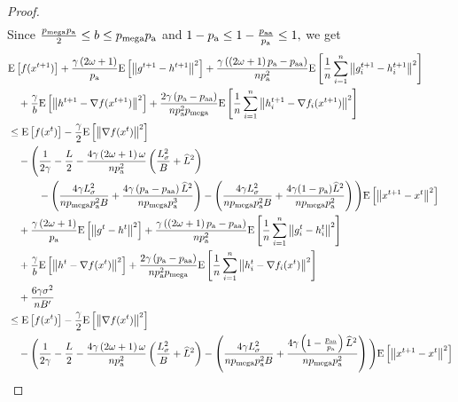 \documentclass{article}
\newcommand*{\probavailable}{\ensuremath{p_{\textnormal{a}}}}
\newcommand*{\probpairaa}{\ensuremath{p_{\textnormal{aa}}}}
\newcommand*{\probmega}{\ensuremath{p_{\text{mega}}}}
\begin{document}
\begin{proof}
\begin{align*}
  \end{align*}
  Since $\frac{\probmega \probavailable}{2} \leq b \leq \probmega \probavailable$ and $1 - \probavailable \leq 1 - \frac{\probpairaa}{\probavailable}\leq 1,$ we get 
  \begin{align*}
    &\Exp{f(x^{t + 1})} + \frac{\gamma \left(2 \omega + 1\right)}{\probavailable} \Exp{\norm{g^{t+1} - h^{t+1}}^2} + \frac{\gamma\left(\left(2 \omega + 1\right)\probavailable - \probpairaa\right)}{n \probavailable^2} \Exp{\frac{1}{n}\sum_{i=1}^n\norm{g^{t+1}_i - h^{t+1}_i}^2}\\
    &\quad  + \frac{\gamma}{b} \Exp{\norm{h^{t+1} - \nabla f(x^{t+1})}^2} + \frac{2 \gamma \left(\probavailable - \probpairaa\right)}{n \probavailable^2 \probmega} \Exp{\frac{1}{n}\sum_{i=1}^n\norm{h^{t+1}_i - \nabla f_i(x^{t+1})}^2}\\
    &\leq \Exp{f(x^t)} - \frac{\gamma}{2}\Exp{\norm{\nabla f(x^t)}^2} \\
    &\quad - \Bigg(\frac{1}{2\gamma} - \frac{L}{2} - \frac{4 \gamma \left(2\omega + 1\right) \omega}{n \probavailable^2}\left(\frac{L_{\sigma}^2}{B} + \widehat{L}^2\right) \\
    &\qquad\quad - \left(\frac{4 \gamma L_{\sigma}^2}{n \probmega \probavailable^2 B} + \frac{4\gamma\left(\probavailable - \probpairaa\right) \widehat{L}^2}{n \probmega \probavailable^3}\right) - \left(\frac{4 \gamma L_{\sigma}^2}{n \probmega \probavailable^2 B} + \frac{4 \gamma (1 - \probavailable) \widehat{L}^2}{n \probmega \probavailable^2}\right)\Bigg) \Exp{\norm{x^{t+1} - x^t}^2} \\
    &\quad + \frac{\gamma \left(2 \omega + 1\right)}{\probavailable} \Exp{\norm{g^{t} - h^{t}}^2} + \frac{\gamma\left(\left(2 \omega + 1\right)\probavailable - \probpairaa\right)}{n \probavailable^2}\Exp{\frac{1}{n}\sum_{i=1}^n\norm{g^{t}_i - h^{t}_i}^2} \\
    &\quad + \frac{\gamma}{b} \Exp{\norm{h^{t} - \nabla f(x^{t})}^2} + \frac{2 \gamma \left(\probavailable - \probpairaa\right)}{n \probavailable^2 \probmega}\Exp{\frac{1}{n}\sum_{i=1}^n\norm{h^{t}_i - \nabla f_i(x^{t})}^2} \\
    &\quad + \frac{6 \gamma \sigma^2}{n B'} \\
    &\leq \Exp{f(x^t)} - \frac{\gamma}{2}\Exp{\norm{\nabla f(x^t)}^2} \\
    &\quad - \Bigg(\frac{1}{2\gamma} - \frac{L}{2} - \frac{4 \gamma \left(2\omega + 1\right) \omega}{n \probavailable^2}\left(\frac{L_{\sigma}^2}{B} + \widehat{L}^2\right) - \left(\frac{4 \gamma L_{\sigma}^2}{n \probmega \probavailable^2 B} + \frac{4\gamma\left(1 - \frac{\probpairaa}{\probavailable}\right) \widehat{L}^2}{n \probmega \probavailable^2}\right)\Bigg) \Exp{\norm{x^{t+1} - x^t}^2} \\

\end{align*}
\end{proof}
\end{document}
